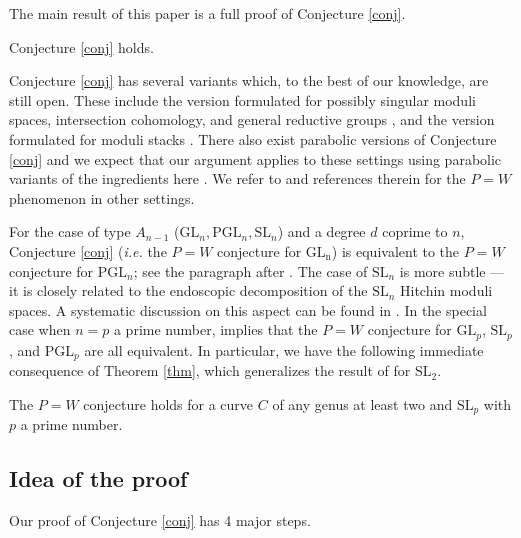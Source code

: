 The main result of this paper is a full proof of Conjecture \ref{conj}.

\begin{thm}
\notready\label{thm}
    Conjecture \ref{conj} holds.
\end{thm}


Conjecture \ref{conj} has several variants which, to the best of our knowledge, are still open. These include the version formulated for possibly singular moduli spaces, intersection cohomology, and general reductive groups \cite{dCHM1,dCM,FM}, and the version formulated for moduli stacks \cite{Davison}.  There also exist parabolic versions of Conjecture \ref{conj} and we expect that our argument applies to these settings using parabolic variants of the ingredients here \cite{Mellit,OY}. We refer to \cite{DMS,HLSY,Geo_P-W,Zhang} and references therein for the $P=W$ phenomenon in other settings.


For the case of type $A_{n-1}$ ($\mathrm{GL}_n, \mathrm{PGL}_n, \mathrm{SL}_n$) and a degree $d$ coprime to $n$, Conjecture \ref{conj} (\emph{i.e.} the $P=W$ conjecture for $\mathrm{GL_n}$) is equivalent to the $P=W$ conjecture for $\mathrm{PGL}_n$; see the paragraph after \cite[Theorem 0.2]{dCMS}. The case of $\mathrm{SL}_n$ is more subtle --- it is closely related to the endoscopic decomposition of the $\mathrm{SL}_n$ Hitchin moduli spaces. A systematic discussion on this aspect can be found in \cite[Section 5]{MS}. In the special case when $n=p$ a prime number, \cite[Theorem 0.2]{SLn} implies that the $P=W$ conjecture for $\mathrm{GL}_p$, $\mathrm{SL}_p$, and $\mathrm{PGL}_p$ are all equivalent. In particular, we have the following immediate consequence of Theorem \ref{thm}, which generalizes the result of \cite{dCHM1} for $\mathrm{SL}_2$.

\begin{thm}
\notready
The $P=W$ conjecture holds for a curve $C$ of any genus at least two and $\mathrm{SL}_p$ with $p$ a prime number.
\end{thm}






\subsection{Idea of the proof}
Our proof of Conjecture \ref{conj} has 4 major steps.

